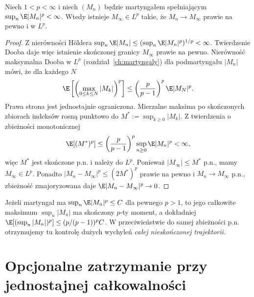 \begin{twierdzenie}
Niech $1<p<\infty$ i niech $(M_n)$ będzie martyngałem
spełniającym $\sup_n\E|M_n|^p<\infty$.
Wtedy istnieje $M_\infty\in L^p$ takie, że
$M_n\to M_\infty$ prawie na pewno i w $L^p$.
\end{twierdzenie}
\begin{proof}
Z nierówności Höldera
$\sup_n\E|M_n|\leq(\sup_n\E|M_n|^p)^{1/p}<\infty$.
Twierdzenie Dooba daje więc istnienie skończonej
granicy $M_\infty$ prawie na pewno.
Nierówność maksymalna Dooba w $L^p$
(rozdział~\ref{ch:martyngaly}) dla
podmartyngału $|M_n|$ mówi, że dla każdego $N$
\[
\E\left[\left(\max_{0\leq k\leq N}|M_k|\right)^p\right]
\leq\left(\frac{p}{p-1}\right)^p\E|M_N|^p.
\]
Prawa strona jest jednostajnie ograniczona.
Mierzalne maksima po skończonych zbiorach indeksów
rosną punktowo do $M^*:=\sup_{k\geq0}|M_k|$.
Z twierdzenia o zbieżności monotonicznej
\[
\E[(M^*)^p]\leq
\left(\frac{p}{p-1}\right)^p\sup_{n\geq0}\E|M_n|^p<\infty,
\]
więc $M^*$ jest skończone p.n. i należy do $L^p$.
Ponieważ $|M_\infty|\leq M^*$ p.n.,
mamy $M_\infty\in L^p$. Ponadto
$|M_n-M_\infty|^p\leq (2M^*)^p$
prawie na pewno i $M_n\to M_\infty$ p.n.,
zbieżność zmajoryzowana daje
$\E|M_n-M_\infty|^p\to0$.
\end{proof}

\begin{przyklad}
Jeżeli martyngał ma $\sup_n\E|M_n|^p\leq C$
dla pewnego $p>1$, to jego całkowite
maksimum $\sup_n|M_n|$ ma skończony $p$-ty moment,
a dokładniej
$\E[(\sup_n|M_n|)^p]\leq(p/(p-1))^pC$.
W przeciwieństwie do samej zbieżności p.n.
otrzymujemy tu kontrolę dużych wychyleń
\emph{całej nieskończonej trajektorii}.
\end{przyklad}

\section{Opcjonalne zatrzymanie przy jednostajnej całkowalności}

